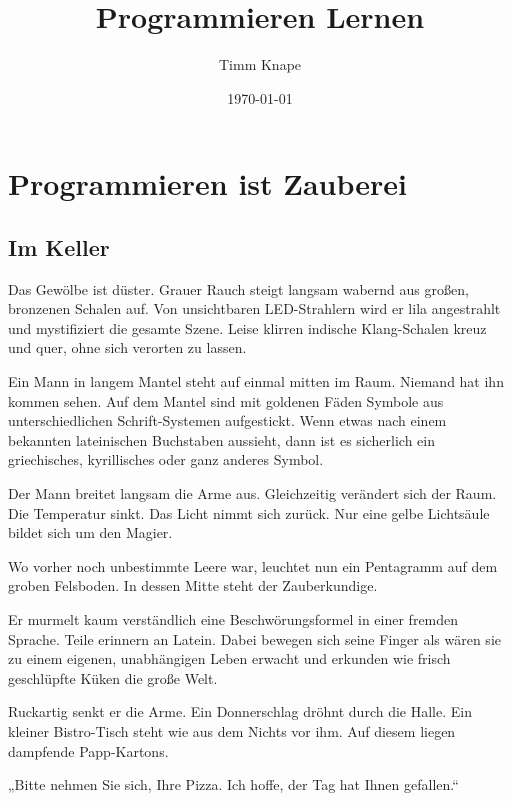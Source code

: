 \documentclass[a5paper,ngerman,9pt]{article}
\title{\color{emph}Programmieren Lernen}
\author{Timm Knape}
\date{\today}
\begin{document}
\pagecolor{background}
\color{normal}
\allsectionsfont{\color{emph}\mdseries}
\pagestyle{plain}
\maketitle
\thispagestyle{fancy}


\section{Programmieren ist Zauberei}

\begin{multicols}{2}
	\subsection{Im Keller}

	Das Gewölbe ist düster.
	Grauer Rauch steigt langsam wabernd aus großen, bronzenen Schalen
	auf.
	Von unsichtbaren LED-Strahlern wird er lila angestrahlt und
	mystifiziert die gesamte Szene.
	Leise klirren indische Klang-Schalen kreuz und quer, ohne sich
	verorten zu lassen.

	Ein Mann in langem Mantel steht auf einmal mitten im Raum.
	Niemand hat ihn kommen sehen.
	Auf dem Mantel sind mit goldenen Fäden Symbole aus unterschiedlichen
	Schrift-Systemen aufgestickt.
	Wenn etwas nach einem bekannten lateinischen Buchstaben aussieht,
	dann ist es sicherlich ein griechisches, kyrillisches oder ganz
	anderes Symbol.

	Der Mann breitet langsam die Arme aus.
	Gleichzeitig verändert sich der Raum.
	Die Temperatur sinkt.
	Das Licht nimmt sich zurück.
	Nur eine gelbe Lichtsäule bildet sich um den Magier.

	Wo vorher noch unbestimmte Leere war, leuchtet nun ein Pentagramm
	auf dem groben Felsboden.
	In dessen Mitte steht der Zauberkundige.

	Er murmelt kaum verständlich eine Beschwörungsformel in einer
	fremden Sprache.
	Teile erinnern an Latein.
	Dabei bewegen sich seine Finger als wären sie zu einem eigenen,
	unabhängigen Leben erwacht und erkunden wie frisch geschlüpfte
	Küken die große Welt.

	Ruckartig senkt er die Arme.
	Ein Donnerschlag dröhnt durch die Halle.
	Ein kleiner Bistro-Tisch steht wie aus dem Nichts vor ihm.
	Auf diesem liegen dampfende Papp-Kartons.

	„Bitte nehmen Sie sich, Ihre Pizza. Ich hoffe, der Tag hat Ihnen
	gefallen.“


\end{multicols}
\end{document}
